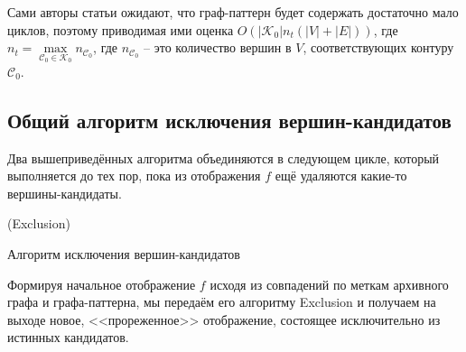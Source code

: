Сами авторы статьи ожидают, что граф-паттерн будет содержать достаточно мало циклов, поэтому приводимая ими оценка $O(|\mathcal{K}_0|n_t(|V| + |E|))$, где $n_t = \max\limits_{\mathcal{C}_0 \in \mathcal{K}_0} n_{\mathcal{C}_0}$, где $n_{\mathcal{C}_0}$ -- это количество вершин в $V$, соответствующих контуру $\mathcal{C}_0$.

\subsection{Общий алгоритм исключения вершин-кандидатов}

Два вышеприведённых алгоритма объединяются в следующем цикле, который выполняется до тех пор, пока из отображения $f$ ещё удаляются какие-то вершины-кандидаты.

\begin{algorithm}
	\Large
	\Begin(Exclusion){
	}

	\caption{Алгоритм исключения вершин-кандидатов}
	\label{alg:EE}
\end{algorithm}

Формируя начальное отображение $f$ исходя из совпадений по меткам архивного графа и графа-паттерна, мы передаём его алгоритму Exclusion и получаем на выходе новое, <<прореженное>> отображение, состоящее исключительно из истинных кандидатов.
